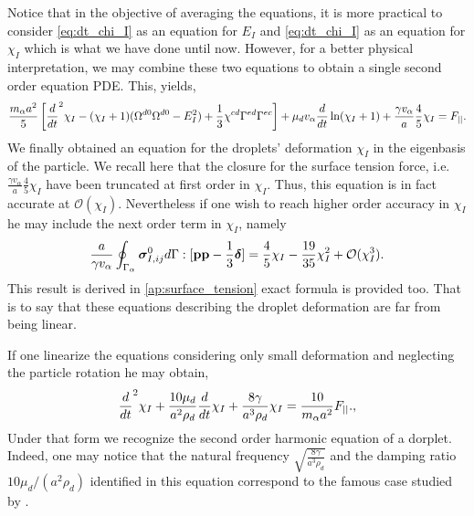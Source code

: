 Notice that in the objective of averaging the equations, it is more practical to consider \ref{eq:dt_chi_I} as an equation for $E_I$ and \ref{eq:dt_chi_I} as an equation for $\chi_I$ which is what we have done until now. 
However, for a better physical interpretation, we may combine these two equations to obtain a single second order equation PDE. 
This, yields, 
\begin{align*}
    \frac{m_\alpha a^2}{5} \left[
        \frac{d}{dt}^2 \chi_I
        - (\chi_I+1)( \Omega^{d0} \Omega^{d0}  - E_I^2) 
        + \frac{1}{3} \chi^{cd}
        \Gamma^{ed}\Gamma^{ec}
    \right]
    +  \mu_d v_\alpha \frac{d}{dt} \ln(\chi_I+1)
    + \frac{\gamma v_\alpha }{a} 
    \frac{4  }{5} \chi_I
    = F_{||}. 
\end{align*} 
We finally obtained an equation for the droplets' deformation $\chi_I$ in the eigenbasis of the particle.
We recall here that the closure for the surface tension force, i.e. $\frac{\gamma v_\alpha }{a} \frac{4  }{5} \chi_I$ have been truncated at first order in $\chi_I$.
Thus, this equation is in fact accurate at $\mathcal{O}(\chi_I)$.
Nevertheless if one wish to reach higher order accuracy in $\chi_I$ he may include the next order term in $\chi_I$, namely 
\begin{equation*}
    \frac{a}{\gamma v_\alpha}\oint_{\Gamma_{\alpha}} \bm\sigma_{I,ij}^0 d\Gamma : [\textbf{pp} - \frac{1}{3} \bm\delta]
    = \frac{4}{5} \chi_I - \frac{19}{35}\chi_I^2 + \mathcal{O}(\chi_I^3). 
\end{equation*}
This result is derived in \ref{ap:surface_tension} exact formula is provided too.  
That is to say that these equations describing the droplet deformation are far from being linear. 


If one linearize the equations considering only small deformation and neglecting the particle rotation he may obtain,  
\begin{equation}
    \frac{d}{dt}^2 \chi_I
    +\frac{10 \mu_d}{a^2\rho_d}   \frac{d}{dt} \chi_I
    + \frac{8 \gamma }{a^3\rho_d} 
     \chi_I
    = \frac{10}{m_\alpha a^2}F_{||}. ,
    \label{eq:lamb_like_model}
\end{equation} 
Under that form we recognize the second order harmonic equation of a dorplet.
Indeed, one may notice that the natural frequency $\sqrt{\frac{8 \gamma }{a^3\rho_d}}$ and the damping ratio $10 \mu_d  /(a^2\rho_d)$ identified in this equation correspond to the famous case studied by  \citet{lamb1924hydrodynamics}. 


